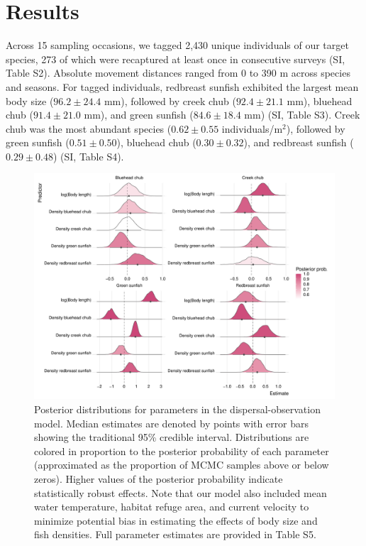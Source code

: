 \documentclass[11pt, class=article, crop=false]{standalone}
\begin{document}
\section{Results}

Across 15 sampling occasions, we tagged 2,430 unique individuals of our target species, 273 of which were recaptured at least once in consecutive surveys (SI, Table S2).  
Absolute movement distances ranged from 0 to 390 m across species and seasons.  
For tagged individuals, redbreast sunfish exhibited the largest mean body size ($96.2 \pm 24.4$ mm), followed by creek chub ($92.4 \pm 21.1$ mm), bluehead chub ($91.4 \pm 21.0$ mm), and green sunfish ($84.6 \pm 18.4$ mm) (SI, Table S3).
Creek chub was the most abundant species ($0.62 \pm 0.55$ individuals/m$^2$), followed by green sunfish ($0.51 \pm 0.50$), bluehead chub ($0.30 \pm 0.32$), and redbreast sunfish ($0.29 \pm 0.48$) (SI, Table S4).  

\begin{figure}
    \centering
    \includegraphics[width=0.9\linewidth]{output/fig_est.pdf}
    \caption{Posterior distributions for parameters in the dispersal-observation model. Median estimates are denoted by points with error bars showing the traditional 95\% credible interval. 
    Distributions are colored in proportion to the posterior probability of each parameter (approximated as the proportion of MCMC samples above or below zeros).
    Higher values of the posterior probability indicate statistically robust effects.
    Note that our model also included mean water temperature, habitat refuge area, and current velocity to minimize potential bias in estimating the effects of body size and fish densities.
    Full parameter estimates are provided in Table S5.}
    \label{fig:fig_est}
\end{figure}
\end{document}
